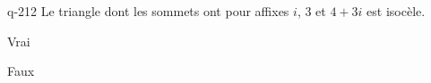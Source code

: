\begin{truefalse}{q-212}
Le triangle dont les sommets ont pour affixes $i$, $3$ et $4+3i$ est isocèle.
\item* Vrai
\item Faux
\end{truefalse}

